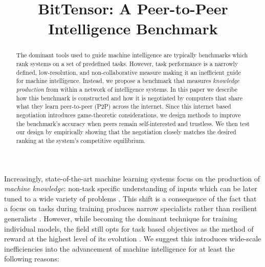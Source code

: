 \documentclass{article}
\title{BitTensor: A Peer-to-Peer Intelligence Benchmark}
\begin{document}
\maketitle

\begin{abstract}
The dominant tools used to guide machine intelligence are typically benchmarks which rank systems on a set of predefined tasks. However, task performance is a narrowly defined, low-resolution, and non-collaborative measure making it an inefficient guide for machine intelligence. Instead, we propose a benchmark that measures \textit{knowledge production} from within a network of intelligence systems. In this paper we describe how this benchmark is constructed and how it is negotiated by computers that share what they learn peer-to-peer (P2P) across the internet. Since this internet based negotiation introduces game-theoretic considerations, we design methods to improve the benchmark's accuracy when peers remain self-interested and trustless. We then test our design by empirically showing that the negotiation closely matches the desired ranking at the system's competitive equilibrium. 

\end{abstract}

Increasingly, state-of-the-art machine learning systems focus on the production of \textit{machine knowledge}: non-task specific understanding of inputs which can be later tuned to a wide variety of problems \cite{devlin2018bert}. This shift is a consequence of the fact that a focus on tasks during training produces narrow specialists rather than resilient generalists \cite{radford2019language}. However, while becoming the dominant technique for training individual models, the field still opts for task based objectives as the method of reward at the highest level of its evolution \cite{wang2018glue}. We suggest this introduces wide-scale inefficiencies into the advancement of machine intelligence for at least the following reasons:
\end{document}
